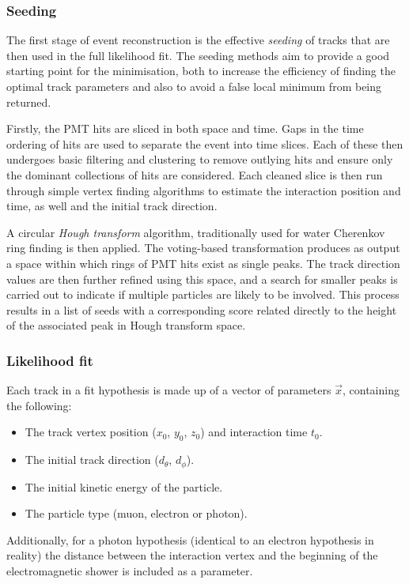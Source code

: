 \subsubsection*{Seeding} %

The first stage of event reconstruction is the effective \emph{seeding} of tracks that are then
used in the full likelihood fit. The seeding methods aim to provide a good starting point for the
minimisation, both to increase the efficiency of finding the optimal track parameters and also to
avoid a false local minimum from being returned.

Firstly, the PMT hits are sliced in both space and time. Gaps in the time ordering of hits are
used to separate the event into time slices. Each of these then undergoes basic filtering and
clustering to remove outlying hits and ensure only the dominant collections of hits are
considered. Each cleaned slice is then run through simple vertex finding algorithms to estimate
the interaction position and time, as well and the initial track direction.

A circular \emph{Hough transform} algorithm, traditionally used for water Cherenkov ring finding
is then applied. The voting-based transformation produces as output a space within which rings of
PMT hits exist as single peaks. The track direction values are then further refined using this
space, and a search for smaller peaks is carried out to indicate if multiple particles are likely
to be involved. This process results in a list of seeds with a corresponding score related
directly to the height of the associated peak in Hough transform space.

\subsubsection*{Likelihood fit} %

Each track in a fit hypothesis is made up of a vector of parameters $\vec{x}$, containing the
following:
\begin{itemize}
    \item The track vertex position ($x_{0}$, $y_{0}$, $z_{0}$) and interaction time $t_{0}$.
    \item The initial track direction ($d_{\theta}$, $d_{\phi}$).
    \item The initial kinetic energy of the particle.
    \item The particle type (muon, electron or photon).
\end{itemize}
Additionally, for a photon hypothesis (identical to an electron hypothesis in reality) the
distance between the interaction vertex and the beginning of the electromagnetic shower is
included as a parameter.

